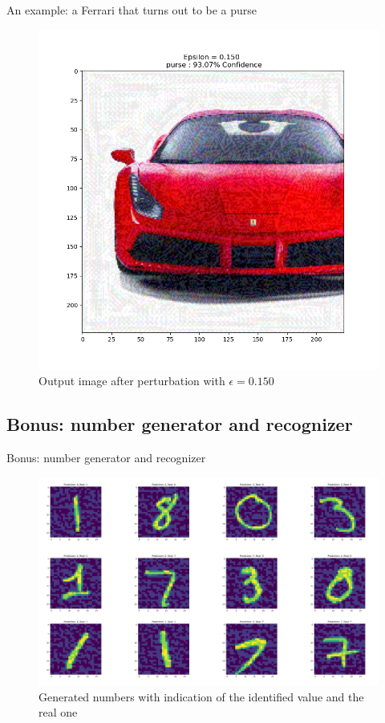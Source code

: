 \documentclass[8pt]{beamer}
\begin{document}
\begin{frame}{An example: a Ferrari that turns out to be a purse}
\begin{figure} 
    \includegraphics[scale=0.3]{images/output_3.png}
    \vspace*{-5mm}
    \caption{Output image after perturbation with $\epsilon=0.150$}
\end{figure}
\end{frame}

\subsection{Bonus: number generator and recognizer}
\begin{frame}{Bonus: number generator and recognizer}
\begin{figure} 
    \includegraphics[scale=0.5]{images/immagini_matrix/matrice_numeri.png}
    \vspace*{-3mm}
    \caption{Generated numbers with indication of the identified value and the real one}
\end{figure}
\end{frame}
\end{document}
